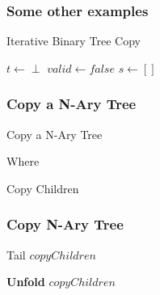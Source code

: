 \documentclass{beamer}
\begin{document}
\begin{frame}
	\frametitle{Some other examples}
	\begin{block}{Iterative Binary Tree Copy}
		\begin{algorithmic}[1]
				\State $t \gets \perp$
				\State $valid \gets false$
				\State $ s \gets []$
				\State {}
			\EndProcedure
		\end{algorithmic}
	\end{block}
\end{frame}
\begin{frame}
	\frametitle{Copy a N-Ary Tree}
	\begin{block}{Copy a N-Ary Tree}
		\begin{algorithmic}[1]
				\State {}
			\EndProcedure
		\end{algorithmic}
	\end{block}
	Where
	\begin{block}{Copy Children}
		\begin{algorithmic}[1]
					\State \Return{$[]$}
				\Else
					\State {}
				\EndIf
			\EndProcedure
		\end{algorithmic}
	\end{block}

\end{frame}
\begin{frame}
	\frametitle{Copy N-Ary Tree}
	\begin{block}{Tail $copyChildren$}
		\begin{algorithmic}[1]
				\State {}
			\EndProcedure
		\end{algorithmic}
	\end{block}
	\begin{block}{\textbf{Unfold} $copyChildren$}
		\begin{algorithmic}[1]
					\State {}
				\Else
					\State {}
				\EndIf
			\EndProcedure
		\end{algorithmic}
	\end{block}
\end{frame}
\end{document}
